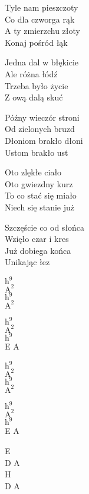 \begin{text}
    Tyle nam pieszczoty\\
    Co dla czworga rąk\\
    A ty zmierzchu złoty\\
    Konaj pośród łąk

    Jedna dal w błękicie\\
    Ale różna łódź\\
    Trzeba było życie\\
    Z ową dalą skuć

    Późny wieczór stroni\\
    Od zielonych bruzd\\
    Dłoniom brakło dłoni\\
    Ustom brakło ust

    Oto zlękłe ciało\\
    Oto gwiezdny kurz\\
    To co stać się miało\\
    Niech się stanie już

    Szczęście co od słońca\\
    Wzięło czar i kres\\
    Już dobiega końca\\
    Unikając łez
\end{text}
\begin{chord}
    $\mathrm{h^{9}}$\\
    $\mathrm{A^{2}}$\\
    $\mathrm{h^{9}}$\\
    $\mathrm{A^{2}}$

    $\mathrm{h^{9}}$\\
    $\mathrm{A^{2}}$\\
    $\mathrm{h^{9}}$\\
    E A

    $\mathrm{h^{9}}$\\
    $\mathrm{A^{2}}$\\
    $\mathrm{h^{9}}$\\
    $\mathrm{A^{2}}$

    $\mathrm{h^{9}}$\\
    $\mathrm{A^{2}}$\\
    $\mathrm{h^{9}}$\\
    E A

    E\\
    D A\\
    H\\
    D A

\end{chord}
